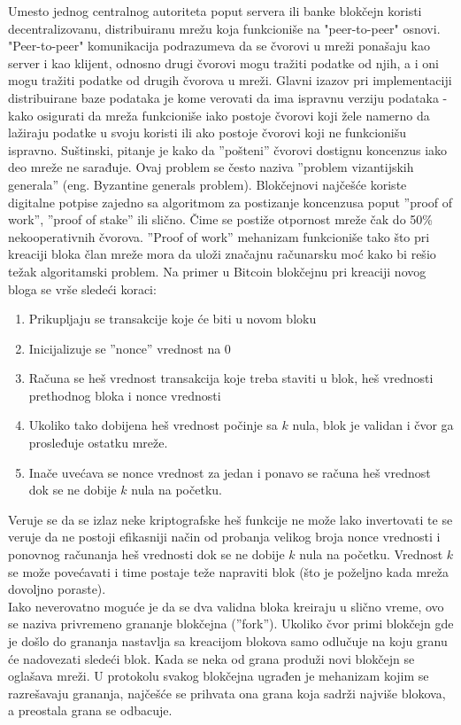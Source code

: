 \documentclass[a4paper]{article}
\begin{document}
{Umesto jednog centralnog autoriteta poput servera ili banke blokčejn koristi decentralizovanu, distribuiranu mrežu
koja funkcioniše na "peer-to-peer" osnovi. "Peer-to-peer" komunikacija podrazumeva da se čvorovi u mreži ponašaju
kao server i kao klijent, odnosno drugi čvorovi mogu tražiti podatke od njih, a i oni mogu tražiti podatke od drugih čvorova u mreži.
Glavni izazov pri implementaciji distribuirane baze podataka je kome verovati da ima ispravnu verziju podataka -
kako osigurati da mreža funkcioniše iako postoje čvorovi koji žele namerno da lažiraju podatke
u svoju koristi ili ako postoje čvorovi koji ne funkcionišu ispravno. Suštinski, pitanje je kako da
''pošteni'' čvorovi dostignu koncenzus iako deo mreže ne sarađuje. Ovaj problem se često naziva ''problem vizantijskih generala'' (eng. Byzantine generals problem).
Blokčejnovi najčešće koriste digitalne potpise zajedno sa algoritmom za postizanje koncenzusa poput ''proof of work'', ''proof of stake'' ili slično.
Čime se postiže otpornost mreže čak do 50\% nekooperativnih čvorova.
''Proof of work'' mehanizam funkcioniše tako što pri kreaciji bloka član mreže mora da uloži značajnu računarsku
moć kako bi rešio težak algoritamski problem. Na primer u Bitcoin blokčejnu pri kreaciji novog bloga se vrše sledeći koraci:
\begin{enumerate}
    \item Prikupljaju se transakcije koje će biti u novom bloku
    \item Inicijalizuje se ''nonce'' vrednost na 0
    \item Računa se heš vrednost transakcija koje treba staviti u blok, heš vrednosti prethodnog bloka i nonce vrednosti
    \item Ukoliko tako dobijena heš vrednost počinje sa $k$ nula, blok je validan i čvor ga prosleđuje ostatku mreže.
    \item Inače uvećava se nonce vrednost za jedan i ponavo se računa heš vrednost dok se ne dobije $k$ nula na početku.
\end{enumerate}
Veruje se da se izlaz neke kriptografske heš funkcije ne može lako invertovati te se veruje da ne postoji
efikasniji način od probanja velikog broja nonce vrednosti i ponovnog računanja heš vrednosti dok se
ne dobije $k$ nula na početku.
Vrednost $k$ se može povećavati i time postaje teže napraviti blok (što je poželjno kada mreža dovoljno poraste).\\
Iako neverovatno moguće je da se dva validna bloka kreiraju u slično vreme, ovo se naziva privremeno grananje blokčejna (''fork'').
Ukoliko čvor primi blokčejn gde je došlo do grananja nastavlja sa kreacijom blokova samo odlučuje na koju granu će nadovezati sledeći blok.
Kada se neka od grana produži novi blokčejn se oglašava mreži. U protokolu svakog blokčejna ugrađen je mehanizam kojim se razrešavaju grananja,
najčešće se prihvata ona grana koja sadrži najviše blokova, a preostala grana se odbacuje.

}
\end{document}

